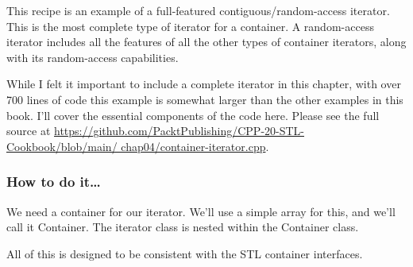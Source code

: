 
This recipe is an example of a full-featured contiguous/random-access iterator. This is the most complete type of iterator for a container. A random-access iterator includes all the features of all the other types of container iterators, along with its random-access capabilities.

While I felt it important to include a complete iterator in this chapter, with over 700 lines of code this example is somewhat larger than the other examples in this book. I'll cover the essential components of the code here. Please see the full source at \url{https://github.com/PacktPublishing/CPP-20-STL-Cookbook/blob/main/ chap04/container-iterator.cpp}.


\subsubsection{How to do it…}

We need a container for our iterator. We'll use a simple array for this, and we'll call it Container. The iterator class is nested within the Container class.

All of this is designed to be consistent with the STL container interfaces.

